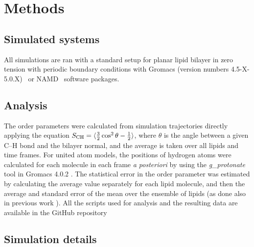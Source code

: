 \documentclass[twoside,twocolumn,9pt]{article}
\begin{document}
\section{Methods}

\subsection{Simulated systems}
All simulations are ran with a standard setup for planar lipid bilayer in zero tension
with periodic boundary conditions with Gromacs (version numbers 4.5-X-5.0.X)~\cite{pronk13,abraham15} 
or NAMD~\cite{NAMD} software packages.

\subsection{Analysis}
The order parameters were calculated from simulation trajectories directly applying the equation
$S_{{\rm CH}}=\langle \frac{3}{2}  \cos^2 \theta-\frac{1}{2} \rangle$,
where $\theta$ is the angle between a given C--H bond and the bilayer normal, and the average is taken
over all lipids and time frames. For united atom models, the positions of hydrogen atoms
were calculated for each molecule in each frame \textit{a posteriori} by using the {\it g\_protonate} tool in 
Gromacs 4.0.2 \cite{gromacsMANUAL402}. 
The statistical error in the order parameter was estimated by calculating the average value separately for each lipid molecule,
and then the average and standard error of the mean over the ensemble of lipids (as done also in previous work \cite{botan15}).
All the scripts used for analysis and the resulting data are available in the GitHub repository \cite{githubIONpaper}

\subsection{Simulation details}
\end{document}
